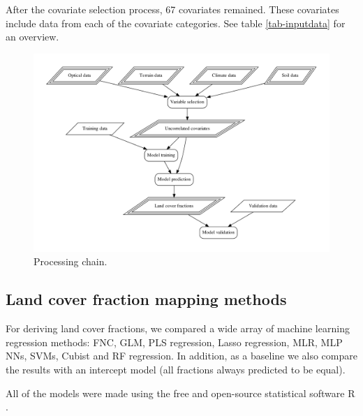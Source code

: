 \documentclass[a4paper,10pt]{article}
\begin{document}
After the covariate selection process, 67 covariates remained.
These covariates include data from each of the covariate categories.
See table \ref{tab-inputdata} for an overview.


\begin{figure}
 \includegraphics[width=\textwidth]{article-figures/flowcharts/processing}
 \caption{Processing chain.}
 \label{fig-processing}
\end{figure}

\subsection{Land cover fraction mapping methods}

For deriving land cover fractions, we compared a wide array of machine learning regression methods: \ac{FNC}, \ac{GLM}, \ac{PLS} regression, Lasso regression, \ac{MLR}, \ac{MLP} \glspl{NN}, \glspl{SVM}, Cubist and \ac{RF} regression.
In addition, as a baseline we also compare the results with an intercept model (all fractions always predicted to be equal).

All of the models were made using the free and open-source statistical software R \citep{r_2019}.

\subsubsection{}
\end{document}
